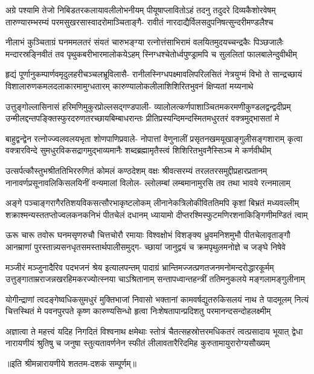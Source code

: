 

\fourlineindentedshloka
{अग्रे पश्यामि तेजो निबिडतरकलायावलीलोभनीयम्}
{पीयूषाप्लावितोऽहं तदनु तदुदरे दिव्यकैशोरवेषम्}
{तारुण्यारम्भरम्यं परमसुखरसास्वादरोमाञ्चिताङ्गै-}
{रावीतं नारदाद्यैर्विलसदुपनिषत्सुन्दरीमण्डलैश्च}

\fourlineindentedshloka
{नीलाभं कुञ्चिताग्रं घनममलतरं संयतं चारुभङ्ग्या}
{रत्नोत्तंसाभिरामं वलयितमुदयच्चन्द्रकैः पिञ्छजालैः}
{मन्दारस्रङ्निवीतं तव पृथुकबरीभारमालोकयेऽहम्}
{स्निग्धश्चेतोर्ध्वपुण्ड्रामपि च सुललितां फालबालेन्दुवीथीम्}

\fourlineindentedshloka
{हृद्यं पूर्णानुकम्पार्णवमृदुलहरीचञ्चलभ्रूविलासै-}
{रानीलस्निग्धपक्ष्मावलिपरिलसितं नेत्रयुग्मं विभो ते}
{सान्द्रच्छायं विशालारुणकमलदलाकारमामुग्धतारम्}
{कारुण्यालोकलीलाशिशिरितभुवनं क्षिप्यतां मय्यनाथे}

\fourlineindentedshloka
{उत्तुङ्गोल्लासिनासं हरिमणिमुकुरप्रोल्लसद्गण्डपाली-}
{व्यालोलत्कर्णपाशाञ्चितमकरमणीकुण्डलद्वन्द्वदीप्रम्}
{उन्मीलद्दन्तपङ्क्तिस्फुरदरुणतरच्छायबिम्बाधरान्तः}
{प्रीतिप्रस्यन्दिमन्दस्मितमधुरतरं वक्त्रमुद्भासतां मे}

\fourlineindentedshloka
{बाहुद्वन्द्वेन रत्नोज्ज्वलवलयभृता शोणपाणिप्रवाले-}
{नोपात्तां वेणुनालीं प्रसृतनखमयूखाङ्गुलीसङ्गशाराम्}
{कृत्वा वक्त्रारविन्दे सुमधुरविकसद्रागमुद्भाव्यमानैः}
{शब्दब्रह्मामृतैस्त्वं शिशिरितभुवनैस्सिञ्च मे कर्णवीथीम्}

\fourlineindentedshloka
{उत्सर्पत्कौस्तुभश्रीततिभिररुणितं कोमलं कण्ठदेशम्}
{वक्षः श्रीवत्सरम्यं तरलतरसमुद्दीप्रहारप्रतानम्}
{नानावर्णप्रसूनावलिकिसलयिनीं वन्यमालां विलोल-}
{ल्लोलम्बां लम्बमानामुरसि तव तथा भावये रत्नमालाम्}

\fourlineindentedshloka
{अङ्गे पञ्चाङ्गरागैरतिशयविकसत्सौरभाकृष्टलोकम्}
{लीनानेकत्रिलोकीविततिमपि कृशां बिभ्रतं मध्यवल्लीम्}
{शक्राश्मन्यस्ततप्तोज्वलकनकनिभं पीतचेलं दधानम्}
{ध्यायामो दीप्तरश्मिस्फुटमणिरशनाकिङ्गिणीमण्डितं त्वाम्}

\fourlineindentedshloka
{ऊरू चारू तवोरू घनमसृणरुचौ चित्तचोरौ रमायाः}
{विश्वक्षोभं विशङ्क्य ध्रुवमनिशमुभौ पीतचेलावृताङ्गौ}
{आनम्राणां पुरस्तान्न्यसनधृतसमस्तार्थपालीसमुद्ग-}
{च्छायां जानुद्वयं च क्रमपृथुलमनोज्ञे च जङ्घे निषेवे}

\fourlineindentedshloka
{मञ्जीरं मञ्जुनादैरिव पदभजनं श्रेय इत्यालपन्तम्}
{पादाग्रं भ्रान्तिमज्जत्प्रणतजनमनोमन्दरोद्धारकूर्मम्}
{उत्तुङ्गाताम्रराजन्नखरहिमकरज्योत्स्नया चाऽश्रितानाम्}
{सन्तापध्वान्तहन्त्रीं ततिमनुकलये मङ्गलामङ्गुलीनाम्}

\fourlineindentedshloka
{योगीन्द्राणां त्वदङ्गेष्वधिकसुमधुरं मुक्तिभाजां निवासो}
{भक्तानां कामवर्षद्युतरुकिसलयं नाथ ते पादमूलम्}
{नित्यं चित्तस्थितं मे पवनपुरपते कृष्ण कारुण्यसिन्धो}
{हृत्वा निःशेषतापान्प्रदिशतु परमानन्दसन्दोहलक्ष्मीम्}

\fourlineindentedshloka
{अज्ञात्वा ते महत्त्वं यदिह निगदितं विश्वनाथ क्षमेथाः}
{स्तोत्रं चैतत्सहस्रोत्तरमधिकतरं त्वत्प्रसादाय भूयात्}
{द्वेधा नारायणीयं श्रुतिषु च जनुषा स्तुत्यतावर्णनेन}
{स्फीतं लीलावतारैरिदमिह कुरुतामायुरारोग्यसौख्यम्}

{॥इति श्रीमन्नारायणीये शततम-दशकं सम्पूर्णम्॥}

